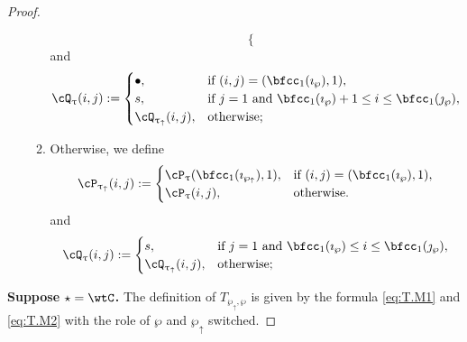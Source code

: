 \documentclass[12pt,a4paper]{amsart}
\def\wpu{\wp_{\uparrow}}
\def\wpd{\wp} %
\def\uptauu{\uptau_{\uparrow}}
\def\uptaud{\uptau} %
\numberwithin{equation}{section}
\theoremstyle{remark}
\begin{document}
\begin{proof}
\begin{enumerate}[label=(\alph*)]
\begin{enumerate}[label={\localtextbulletone}]
\[\begin{cases}
       \end{cases}
     \]
     and
     \[
       \cQ_{\uptaud}(i,j) := \begin{cases}
         \bullet ,& \text{if $(i,j)=(\bfcc_{1}(\imath_{\wpd}),1)$},\\
         s ,& \text{if $j=1$ and $\bfcc_{1}(\imath_{\wpd})+1\leq i \leq \bfcc_{1}(\jmath_{\wpd})$},\\
         \cQ_{\uptauu}(i,j) ,&\text{otherwise};
       \end{cases}
     \]
     \item Otherwise, we define
     \[
       \cP_{\uptauu}(i,j) := \begin{cases}
         \cP_{\uptaud}(\bfcc_{1}(\imath_{\wpu}),1), & \text{if $(i,j)=(\bfcc_{1}(\imath_{\wpd}),1)$},\\
         \cP_{\uptaud}(i,j) ,&\text{otherwise}.
       \end{cases}
     \]
     and
     \[
       \cQ_{\uptaud}(i,j) := \begin{cases}
         s ,& \text{if $j=1$ and $\bfcc_{1}(\imath_{\wpd})\leq i \leq \bfcc_{1}(\jmath_{\wpd})$},\\
         \cQ_{\uptauu}(i,j) ,&\text{otherwise};
       \end{cases}
     \]
   \end{enumerate}
 \end{enumerate}


  {\bfseries Suppose $\star = \wtC$.}
  The definition of $T_{\wpu,\wp}$ is given by the formula \eqref{eq:T.M1} and
  \eqref{eq:T.M2} with the
  role of $\wp$ and $\wpu$ switched.




\end{proof}
\end{document}
